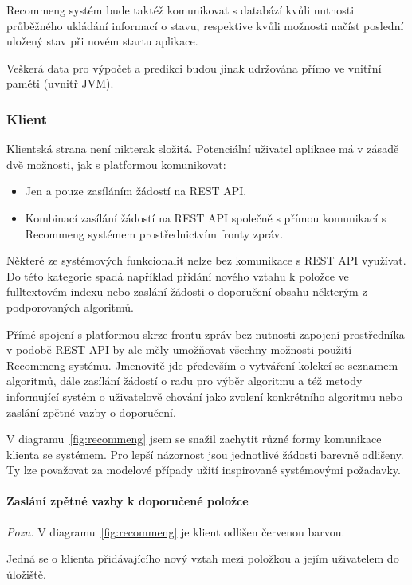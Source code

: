 \documentclass[thesis=M,czech]{FITthesis}[2014/05/07]
\begin{document}
Recommeng systém bude taktéž komunikovat s databází kvůli nutnosti průběžného ukládání informací o stavu, respektive kvůli možnosti načíst poslední uložený stav při novém startu aplikace.

Veškerá data pro výpočet a predikci budou jinak udržována přímo ve vnitřní paměti (uvnitř JVM).

\subsubsection{Klient}

Klientská strana není nikterak složitá. Potenciální uživatel aplikace má v zásadě dvě možnosti, jak s platformou komunikovat:

\begin{itemize}
	\item Jen a pouze zasíláním žádostí na REST API.
	\item Kombinací zasílání žádostí na REST API společně s přímou komunikací s Recommeng systémem prostřednictvím fronty zpráv.
\end{itemize}

Některé ze systémových funkcionalit nelze bez komunikace s REST API využívat. Do této kategorie spadá například přidání nového vztahu k položce ve fulltextovém indexu nebo zaslání žádosti o doporučení obsahu některým z podporovaných algoritmů. 

Přímé spojení s platformou skrze frontu zpráv bez nutnosti zapojení prostředníka v podobě REST API by ale měly umožňovat všechny možnosti použití Recommeng systému. Jmenovitě jde především o vytváření kolekcí se seznamem algoritmů, dále zasílání žádostí o radu pro výběr algoritmu a též metody informující systém o uživatelově chování jako zvolení konkrétního algoritmu nebo zaslání zpětné vazby o doporučení. 

V diagramu~\ref{fig:recommeng} jsem se snažil zachytit různé formy komunikace klienta se systémem. Pro lepší názornost jsou jednotlivé žádosti barevně odlišeny. Ty lze považovat za modelové případy užití inspirované systémovými požadavky.

\paragraph{Zaslání zpětné vazby k doporučené položce}
\emph{Pozn.} V diagramu~\ref{fig:recommeng} je klient odlišen červenou barvou. 

Jedná se o klienta přidávajícího nový vztah mezi položkou a jejím uživatelem do úložiště.
\end{document}
